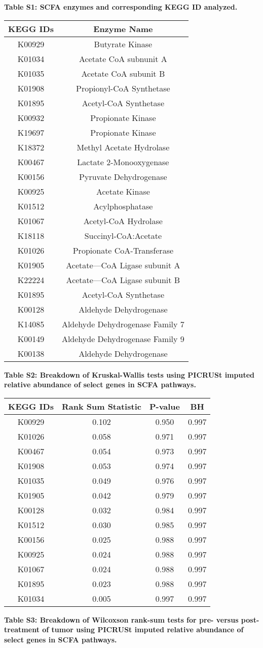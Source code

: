 \documentclass[11pt,]{article}
\title{}
\author{}
\date{}
\begin{document}

\textbf{Table S1: SCFA enzymes and corresponding KEGG ID analyzed.}

\begin{longtable}[]{@{}cc@{}}
\toprule
KEGG IDs & Enzyme Name\tabularnewline
\midrule
\endhead
K00929 & Butyrate Kinase\tabularnewline
K01034 & Acetate CoA subnunit A\tabularnewline
K01035 & Acetate CoA subunit B\tabularnewline
K01908 & Propionyl-CoA Synthetase\tabularnewline
K01895 & Acetyl-CoA Synthetase\tabularnewline
K00932 & Propionate Kinase\tabularnewline
K19697 & Propionate Kinase\tabularnewline
K18372 & Methyl Acetate Hydrolase\tabularnewline
K00467 & Lactate 2-Monooxygenase\tabularnewline
K00156 & Pyruvate Dehydrogenase\tabularnewline
K00925 & Acetate Kinase\tabularnewline
K01512 & Acylphosphatase\tabularnewline
K01067 & Acetyl-CoA Hydrolase\tabularnewline
K18118 & Succinyl-CoA:Acetate\tabularnewline
K01026 & Propionate CoA-Transferase\tabularnewline
K01905 & Acetate---CoA Ligase subunit A\tabularnewline
K22224 & Acetate---CoA Ligase subunit B\tabularnewline
K01895 & Acetyl-CoA Synthetase\tabularnewline
K00128 & Aldehyde Dehydrogenase\tabularnewline
K14085 & Aldehyde Dehydrogenase Family 7\tabularnewline
K00149 & Aldehyde Dehydrogenase Family 9\tabularnewline
K00138 & Aldehyde Dehydrogenase\tabularnewline
\bottomrule
\end{longtable}

\newpage

\textbf{Table S2: Breakdown of Kruskal-Wallis tests using PICRUSt
imputed relative abundance of select genes in SCFA pathways.}

\begin{longtable}[]{@{}cccc@{}}
\toprule
KEGG IDs & Rank Sum Statistic & P-value & BH\tabularnewline
\midrule
\endhead
K00929 & 0.102 & 0.950 & 0.997\tabularnewline
K01026 & 0.058 & 0.971 & 0.997\tabularnewline
K00467 & 0.054 & 0.973 & 0.997\tabularnewline
K01908 & 0.053 & 0.974 & 0.997\tabularnewline
K01035 & 0.049 & 0.976 & 0.997\tabularnewline
K01905 & 0.042 & 0.979 & 0.997\tabularnewline
K00128 & 0.032 & 0.984 & 0.997\tabularnewline
K01512 & 0.030 & 0.985 & 0.997\tabularnewline
K00156 & 0.025 & 0.988 & 0.997\tabularnewline
K00925 & 0.024 & 0.988 & 0.997\tabularnewline
K01067 & 0.024 & 0.988 & 0.997\tabularnewline
K01895 & 0.023 & 0.988 & 0.997\tabularnewline
K01034 & 0.005 & 0.997 & 0.997\tabularnewline
\bottomrule
\end{longtable}

\newpage

\textbf{Table S3: Breakdown of Wilcoxson rank-sum tests for pre- versus
post-treatment of tumor using PICRUSt imputed relative abundance of
select genes in SCFA pathways.}
\end{document}
